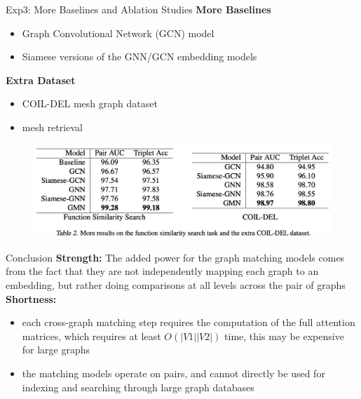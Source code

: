 \documentclass{beamer}
\begin{document}
\begin{frame}{Exp3: More Baselines and Ablation Studies}
\textbf{More Baselines}
\begin{itemize}
    \item Graph Convolutional Network (GCN) model
    \item Siamese versions of the GNN/GCN embedding models
\end{itemize}
\textbf{Extra Dataset}
\begin{itemize}
    \item COIL-DEL mesh graph dataset
    \item mesh retrieval
\end{itemize}
\begin{figure}[h]
\centering
\includegraphics[height=0.4\textheight]{pic/GMN/gmn_table2.png}
\end{figure}
\end{frame}


\begin{frame}{Conclusion}
\textbf{Strength:}
The added power for the graph matching models comes from the fact that they are not independently mapping each graph to an embedding, but rather doing comparisons at all levels across the pair of graphs \\

\textbf{Shortness:}
\begin{itemize}
    \item each cross-graph matching step requires the computation of the full attention matrices, which requires at least $O(|V1||V2|)$ time, this may be expensive for large graphs
    \item the matching models operate on pairs, and cannot directly be used for indexing and searching through large graph databases
\end{itemize}
\end{frame}
\end{document}
